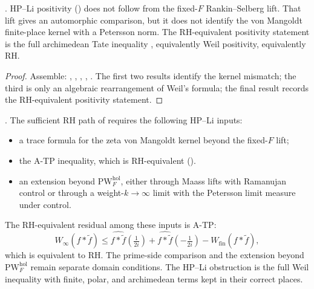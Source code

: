 \begin{theorem}
\label{v4-arith:w5-a:thm:hpli-form}
\ClaimStatusProvedHere. HP--Li positivity
() does not follow from the
fixed-\(F\) Rankin--Selberg lift. That lift gives an automorphic
comparison, but it does not identify the von Mangoldt finite-place
kernel with a Petersson norm. The RH-equivalent positivity statement is
the full archimedean Tate inequality
, equivalently
Weil positivity, equivalently RH.
\end{theorem}

\begin{proof}
Assemble:
,
,
,
,
.
The first two results identify the kernel mismatch; the third is only
an algebraic rearrangement of Weil's formula; the final result records
the RH-equivalent positivity statement.
\end{proof}

\begin{corollary}
\label{v4-arith:w5-a:cor:sufficient-path-impact}
\ClaimStatusProvedHere. The sufficient RH path of
 requires the following HP--Li
inputs:
\begin{itemize}
\item a trace formula for the zeta von Mangoldt kernel beyond the
fixed-\(F\) lift;
\item the A-TP inequality, which is RH-equivalent
().
\item an extension beyond \(\mathrm{PW}^{\mathrm{hol}}_{F}\), either
through Maass lifts with Ramanujan control or through a
weight-\(k\to\infty\) limit with the Petersson limit measure under
control.
\end{itemize}
The RH-equivalent residual among these inputs is A-TP:
\[
W_{\infty}(f*\widetilde f)\le
\widehat{f*\widetilde f}(\tfrac{1}{2i})+
\widehat{f*\widetilde f}(-\tfrac{1}{2i})-
W_{\mathrm{fin}}(f*\widetilde f),
\]
which is equivalent to RH.
The prime-side comparison and the extension beyond
\(\mathrm{PW}^{\mathrm{hol}}_{F}\) remain separate domain conditions.
The HP--Li obstruction is the full Weil inequality with finite, polar,
and archimedean terms kept in their correct places.
\end{corollary}

